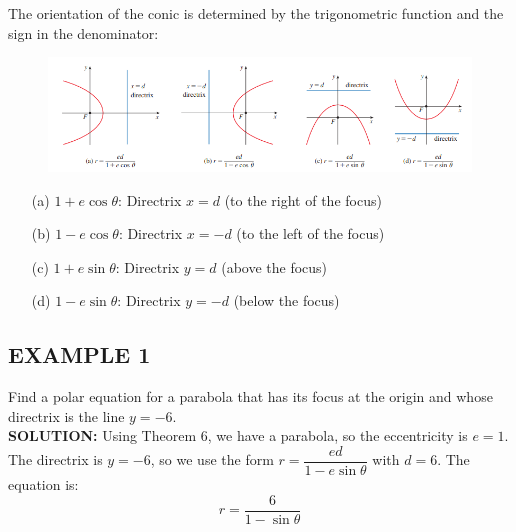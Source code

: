 \documentclass{article}
\begin{document}
The orientation of the conic is determined by the trigonometric function and the sign in the denominator:

\begin{figure}[htbp]
    \centering
    \includegraphics[width=1\textwidth]{graph 61.png}
\end{figure}

\begin{itemize}
    \item[(a)] $1 + e \cos\theta$: Directrix $x = d$ (to the right of the focus)
    \item[(b)] $1 - e \cos\theta$: Directrix $x = -d$ (to the left of the focus)
    \item[(c)] $1 + e \sin\theta$: Directrix $y = d$ (above the focus)
    \item[(d)] $1 - e \sin\theta$: Directrix $y = -d$ (below the focus)
\end{itemize}

\subsection*{EXAMPLE 1}
Find a polar equation for a parabola that has its focus at the origin and whose directrix is the line $y = -6$.\\
\textbf{SOLUTION:}
Using Theorem 6, we have a parabola, so the eccentricity is $e = 1$. The directrix is $y = -6$, so we use the form $r = \dfrac{ed}{1 - e \sin\theta}$ with $d = 6$. The equation is:
\[
r = \dfrac{6}{1 - \sin\theta}
\]
\end{document}
